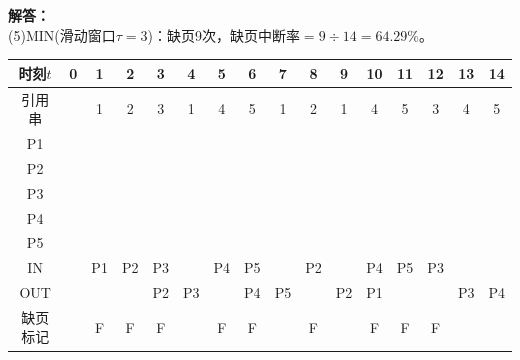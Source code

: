 \documentclass[10pt,a4paper,UTF8]{ctexart}
\newenvironment{solution}{\noindent\textbf{解答：}\\ \indent}{\par}
\begin{document}
\begin{solution}
	(5)MIN(滑动窗口$\tau=3$)：缺页9次，缺页中断率$=9\div 14=64.29\%$。
	\begin{table}[H]
		\vspace{-0.5em}
		\centering
		\begin{tabular}{|c|c|c|c|c|c|c|c|c|c|c|c|c|c|c|c|}
		\hline
		时刻$t$  & 0 & 1  & 2  & 3  & 4  & 5  & 6  & 7  & 8  & 9  & 10 & 11 & 12 & 13 & 14 \\ \hline
		引用串  &   & 1  & 2  & 3  & 1  & 4  & 5  & 1  & 2  & 1  & 4  & 5  & 3  & 4  & 5  \\ \hline
		P1   &   & \checkmark  & \checkmark  & \checkmark  & \checkmark  & \checkmark  & \checkmark  & \checkmark  & \checkmark  & \checkmark  &    &    &    &    &    \\ \hline
		P2   &   &    & \checkmark  &    &    &    &    &    & \checkmark  &    &    &    &    &    &    \\ \hline
		P3   &   &    &    & \checkmark  &    &    &    &    &    &    &    &    & \checkmark  &    &    \\ \hline
		P4   &   &    &    &    &    & \checkmark  &    &    &    &    & \checkmark  & \checkmark  & \checkmark  & \checkmark  &    \\ \hline
		P5   &   &    &    &    &    &    & \checkmark  &    &    &    &    & \checkmark  & \checkmark  & \checkmark  & \checkmark  \\ \hline
		IN   &   & P1 & P2 & P3 &    & P4 & P5 &    & P2 &    & P4 & P5 & P3 &    &    \\ \hline
		OUT  &   &    &    & P2 & P3 &    & P4 & P5 &    & P2 & P1 &    &    & P3 & P4 \\ \hline
		缺页标记 &   & F  & F  & F  &    & F  & F  &    & F  &    & F  & F  & F  &    &    \\ \hline
		\end{tabular}
		\vspace{-1em}
	\end{table}


\end{solution}
\end{document}
